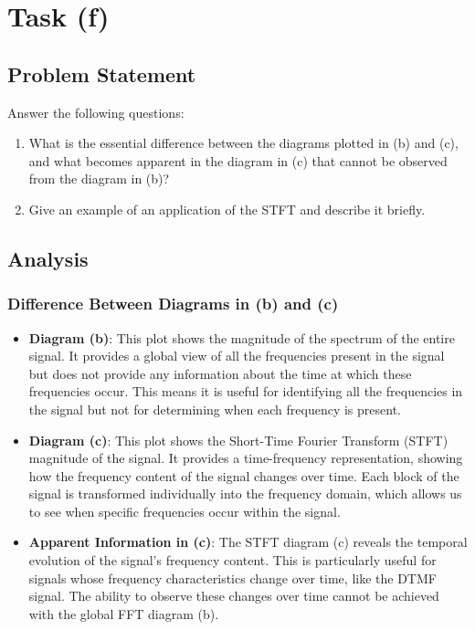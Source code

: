 \item[(f)]
\section*{Task (f)}

\subsection*{Problem Statement}
Answer the following questions:

\begin{enumerate}
    \item What is the essential difference between the diagrams plotted in (b) and (c), and what becomes apparent in the diagram in (c) that cannot be observed from the diagram in (b)?
    \item Give an example of an application of the STFT and describe it briefly.
\end{enumerate}

\subsection*{Analysis}

\subsubsection*{Difference Between Diagrams in (b) and (c)}

\begin{itemize}
    \item \textbf{Diagram (b)}: This plot shows the magnitude of the spectrum of the entire signal. It provides a global view of all the frequencies present in the signal but does not provide any information about the time at which these frequencies occur. This means it is useful for identifying all the frequencies in the signal but not for determining when each frequency is present.

    \item \textbf{Diagram (c)}: This plot shows the Short-Time Fourier Transform (STFT) magnitude of the signal. It provides a time-frequency representation, showing how the frequency content of the signal changes over time. Each block of the signal is transformed individually into the frequency domain, which allows us to see when specific frequencies occur within the signal.

    \item \textbf{Apparent Information in (c)}: The STFT diagram (c) reveals the temporal evolution of the signal's frequency content. This is particularly useful for signals whose frequency characteristics change over time, like the DTMF signal. The ability to observe these changes over time cannot be achieved with the global FFT diagram (b).
\end{itemize}

